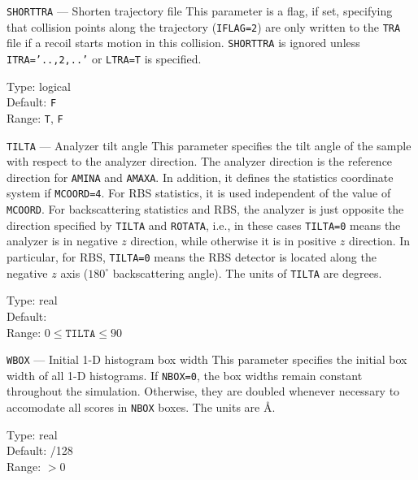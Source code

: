 \begin{keydescription}{\texttt{SHORTTRA} --- Shorten trajectory file}
%
  This parameter is a flag, if set, specifying that collision points
  along the trajectory (\texttt{IFLAG=2}) are only written to the \texttt{TRA}
  file if a recoil starts motion in this collision. \texttt{SHORTTRA} is ignored
  unless \texttt{ITRA='..,2,..'} or \texttt{LTRA=T} is specified.
  \begin{keytab}
    Type:    \> logical \\
    Default: \> \texttt{F} \\
    Range:   \> \texttt{T}, \texttt{F}
  \end{keytab}
\end{keydescription}

\begin{keydescription}{\texttt{TILTA} --- Analyzer tilt angle}
%
  This parameter specifies the tilt angle of the sample with respect to the
  analyzer direction. The analyzer direction is the reference direction for
  \texttt{AMINA} and \texttt{AMAXA}. In addition, it defines the statistics
  coordinate system if \texttt{MCOORD=4}. For RBS statistics, it is used
  independent of the value of \texttt{MCOORD}. For backscattering statistics and
  RBS, the analyzer is just opposite the direction specified by \texttt{TILTA}
  and \texttt{ROTATA}, i.e., in these cases \texttt{TILTA=0} means the analyzer
  is in negative $z$ direction, while otherwise it is in positive $z$ direction.
  In particular, for RBS, \texttt{TILTA=0} means the RBS detector is
  located along the negative $z$ axis ($180^\circ$ backscattering angle). The
  units of \texttt{TILTA} are degrees.
  \begin{keytab}
    Type:    \> real \\
    Default:  \\
    Range:   \> $0 \le \texttt{TILTA} \le 90$
  \end{keytab}
\end{keydescription}

\begin{keydescription}{\texttt{WBOX} --- Initial 1-D histogram box width}
%
  This parameter specifies the initial box width of all 1-D histograms. If
  \texttt{NBOX=0}, the box widths remain constant throughout the simulation.
  Otherwise, they are doubled whenever necessary to accomodate all scores in
  \texttt{NBOX} boxes. The units are \AA.  
  \begin{keytab}
    Type:    \> real \\
    Default: /128 \\
    Range:   \> $> 0$
  \end{keytab}
\end{keydescription}

